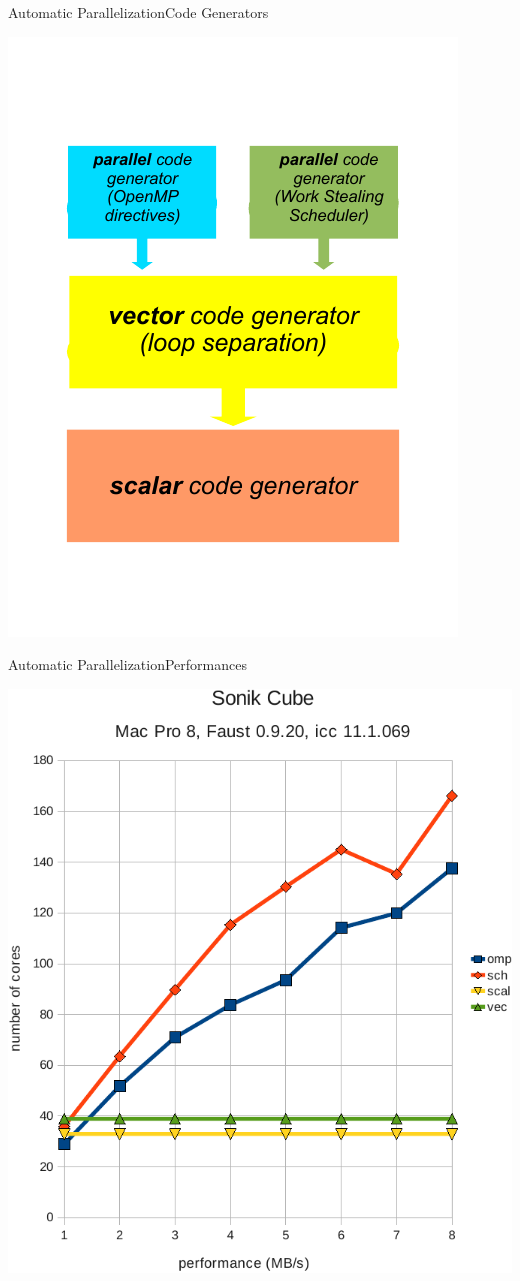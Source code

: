 
\begin{frame}[fragile]{Automatic Parallelization}{Code Generators}
    \begin{center}
        \includegraphics[height=0.75\textheight]{images/compiler-stack1}
    \end{center}
\end{frame}


\begin{frame}[fragile]{Automatic Parallelization}{Performances}
    \begin{center}
        \includegraphics[height=0.75\textheight]{images/ethersonik-bench}
    \end{center}
\end{frame}

